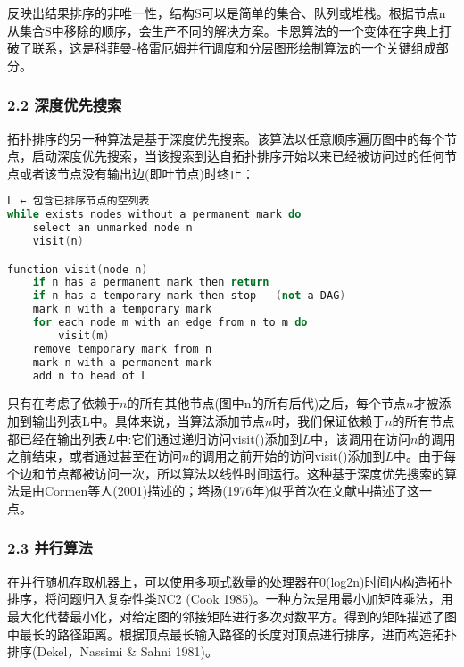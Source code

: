 反映出结果排序的非唯一性，结构S可以是简单的集合、队列或堆栈。根据节点n从集合S中移除的顺序，会生产不同的解决方案。卡恩算法的一个变体在字典上打破了联系，这是科菲曼-格雷厄姆并行调度和分层图形绘制算法的一个关键组成部分。
\subsubsection{2.2 深度优先搜索}
拓扑排序的另一种算法是基于深度优先搜索。该算法以任意顺序遍历图中的每个节点，启动深度优先搜索，当该搜索到达自拓扑排序开始以来已经被访问过的任何节点或者该节点没有输出边(即叶节点)时终止：
\begin{lstlisting}[language=cpp]
L ← 包含已排序节点的空列表
while exists nodes without a permanent mark do
    select an unmarked node n
    visit(n)

function visit(node n)
    if n has a permanent mark then return
    if n has a temporary mark then stop   (not a DAG)
    mark n with a temporary mark
    for each node m with an edge from n to m do
        visit(m)
    remove temporary mark from n
    mark n with a permanent mark
    add n to head of L
\end{lstlisting}
只有在考虑了依赖于$n$的所有其他节点(图中n的所有后代)之后，每个节点$n$才被添加到输出列表L中。具体来说，当算法添加节点$n$时，我们保证依赖于$n$的所有节点都已经在输出列表$L$中:它们通过递归访问visit()添加到$L$中，该调用在访问$n$的调用之前结束，或者通过甚至在访问$n$的调用之前开始的访问visit()添加到$L$中。由于每个边和节点都被访问一次，所以算法以线性时间运行。这种基于深度优先搜索的算法是由Cormen等人(2001)描述的；塔扬(1976年)似乎首次在文献中描述了这一点。
\subsubsection{2.3 并行算法}
在并行随机存取机器上，可以使用多项式数量的处理器在0(log2n)时间内构造拓扑排序，将问题归入复杂性类NC2 (Cook 1985)。一种方法是用最小加矩阵乘法，用最大化代替最小化，对给定图的邻接矩阵进行多次对数平方。得到的矩阵描述了图中最长的路径距离。根据顶点最长输入路径的长度对顶点进行排序，进而构造拓扑排序(Dekel，Nassimi & Sahni 1981)。

